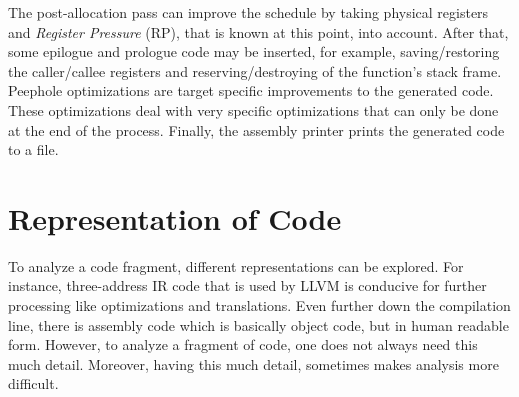 The post-allocation pass can improve the schedule by taking physical registers and \emph{Register Pressure} (RP), that is known at this point, into account. After that, some epilogue and prologue code may be inserted, for example, saving/restoring the caller/callee registers and reserving/destroying of the function's stack frame. Peephole optimizations are target specific improvements to the generated code. These optimizations deal with very specific optimizations that can only be done at the end of the process. Finally, the assembly printer prints the generated code to a file.








\section{Representation of Code}
To analyze a code fragment, different representations can be explored. For instance, three-address IR code that is used by LLVM is conducive for further processing like optimizations and translations. Even further down the compilation line, there is assembly code which is basically object code, but in human readable form. However, to analyze a fragment of code, one does not always need this much detail. Moreover, having this much detail, sometimes makes analysis more difficult. 

